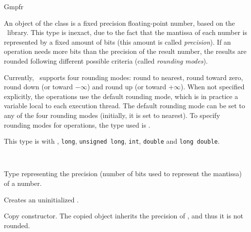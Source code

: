 \begin{ccRefClass} {Gmpfr}
\label{Gmpfr}

\ccDefinition

An object of the class  is a fixed precision floating-point
number, based on the \mpfr\ library. This type is inexact, due to the fact
that the mantissa of each number is represented by a fixed amount of bits
(this amount is called \emph{precision}). If an operation needs more bits
than the precision of the result number, the results are rounded following
different possible criteria (called \emph{rounding modes}).

Currently, \mpfr\ supports four rounding modes: round to nearest,
round toward zero, round down (or toward $-\infty$) and round up
(or toward $+\infty$).  When not specified explicitly, the
operations use the default rounding mode, which is in practice a
variable local to each execution thread. The default rounding mode
can be set to any of the four rounding modes (initially, it is set
to nearest). To specify rounding modes for operations, the type
used is .

This type is  with , \verb-long-,
\verb-unsigned long-, \verb-int-, \verb-double- and \verb-long double-.


\ccIsModel
{}\\

\ccTypes

                {Type representing the precision (number of bits
                used to represent the mantissa) of a number.}

\ccCreation
{}

        {Creates an uninitialized  \ccVar.}

        {Copy constructor. The copied object inherits the precision of
        , and thus it is not rounded.}



\end{ccRefClass}
